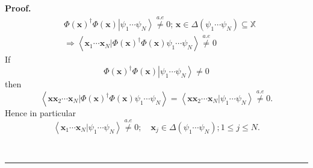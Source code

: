 \documentclass[aps,preprint]{revtex4}%
\newenvironment{proof}[1][Proof]{\noindent\textbf{#1.} }{\ \rule{0.5em}{0.5em}}
\begin{document}
\begin{proof}%
\begin{align}
&  \Phi\left(  \mathbf{x}\right)  ^{\dagger}\Phi\left(  \mathbf{x}\right)
\left\vert \psi_{1}\cdots\psi_{N}\right\rangle \overset{a.e}{\neq
}0;\,\mathbf{x\in}\Delta\left(  \psi_{1}\cdots\psi_{N}\right)
\mathbf{\subseteq}\mathbb{X}\nonumber\\
&  \left.  \Rightarrow\right.  \left\langle \left.  \mathbf{x}_{1}%
\cdots\mathbf{x}_{N}\right\vert \Phi\left(  \mathbf{x}\right)  ^{\dagger}%
\Phi\left(  \mathbf{x}\right)  \psi_{1}\cdots\psi_{N}\right\rangle
\overset{a.e}{\neq}0
\end{align}
If
\begin{equation}
\Phi\left(  \mathbf{x}\right)  ^{\dagger}\Phi\left(  \mathbf{x}\right)
\left\vert \psi_{1}\cdots\psi_{N}\right\rangle \neq0
\end{equation}
then
\begin{equation}
\left\langle \left.  \mathbf{xx}_{2}\cdots\mathbf{x}_{N}\right\vert
\Phi\left(  \mathbf{x}\right)  ^{\dagger}\Phi\left(  \mathbf{x}\right)
\psi_{1}\cdots\psi_{N}\right\rangle =\left\langle \left.  \mathbf{xx}%
_{2}\cdots\mathbf{x}_{N}\right\vert \psi_{1}\cdots\psi_{N}\right\rangle
\overset{a.e}{\neq}0.
\end{equation}
Hence in particular
\begin{equation}
\left\langle \left.  \mathbf{x}_{1}\cdots\mathbf{x}_{N}\right\vert \psi
_{1}\cdots\psi_{N}\right\rangle \overset{a.e}{\neq}0;\quad\mathbf{x}_{j}%
\in\Delta\left(  \psi_{1}\cdots\psi_{N}\right)  \mathbf{;}1\mathbf{\leq}j\leq
N.
\end{equation}
%


\end{proof}
\end{document}
